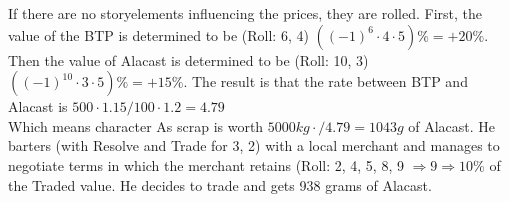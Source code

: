 If there are no storyelements influencing the prices, they are rolled.
First, the value of the BTP is determined to be (Roll: 6, 4) \(((-1)^{6}\cdot4\cdot5) \% = +20\%\).
Then the value of Alacast is determined
to be (Roll: 10, 3)\(((-1)^{10}\cdot3\cdot5) \% = +15\%\).
The result is that the rate between BTP and Alacast is
\( 500\cdot1.15/100\cdot1.2 = 4.79\) \\ Which means character As scrap is worth
\(5000 kg\cdot / 4.79 = 1043 g \) of Alacast.
He barters (with Resolve and Trade for 3, 2) with a local merchant and manages to
negotiate terms in which the merchant retains (Roll: 2, 4, 5, 8, 9 \(\Rightarrow 9 \Rightarrow 10\%\) of the Traded
value.
He decides to trade and gets 938 grams of Alacast.\vspace{1.5cm}
\pagebreak
